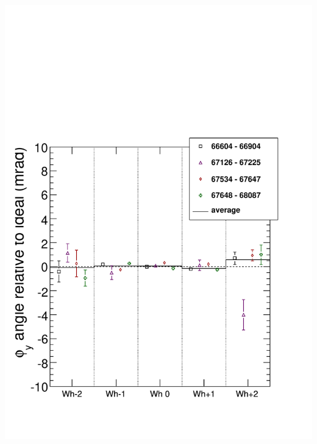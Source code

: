 \documentclass[compress]{beamer}
\begin{document}
\begin{frame}
{\begin{columns}
\includegraphics[width=\linewidth]{bydataset_MP_phiy.pdf}
\end{columns}}
\end{frame}
\end{document}
